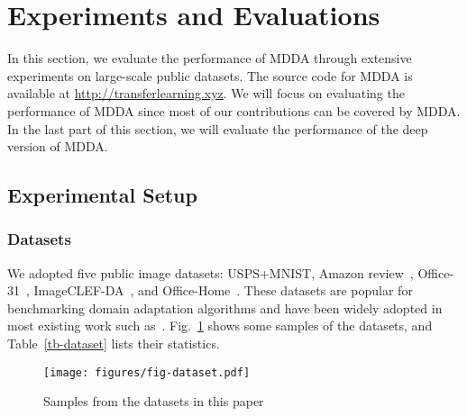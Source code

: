 \documentclass[acmsmall]{acmart}
\begin{document}
\section{Experiments and Evaluations}
\label{sec-exp}
In this section, we evaluate the performance of MDDA through extensive experiments on large-scale public datasets. The source code for MDDA is available at \url{http://transferlearning.xyz}. We will focus on evaluating the performance of MDDA since most of our contributions can be covered by MDDA. In the last part of this section, we will evaluate the performance of the deep version of MDDA.

\subsection{Experimental Setup}

\subsubsection{Datasets}
\label{sec-exp-data}

We adopted five public image datasets: USPS+MNIST, Amazon review~\cite{blitzer2006domain}, Office-31~\cite{saenko2010adapting}, ImageCLEF-DA~\cite{long2017deep}, and Office-Home~\cite{venkateswara2017deep}. These datasets are popular for benchmarking domain adaptation algorithms and have been widely adopted in most existing work such as~\cite{zhang2017joint,long2018conditional,zhang2018collaborative,chen2018joint}. Fig.~\ref{fig-dataset} shows some samples of the datasets, and Table~\ref{tb-dataset} lists their statistics.

\begin{figure}[htbp]
	\centering
	\texttt{[image: figures/fig-dataset.pdf]}
	\vspace{-.1in}
	\caption{Samples from the datasets in this paper}
	\label{fig-dataset}
	\vspace{-.2in}
\end{figure}

\begin{table}[htbp]
	\centering
	\caption{Statistics of the five benchmark datasets.}
	\vspace{-.1in}
	\label{tb-dataset}
\end{table}
\end{document}
